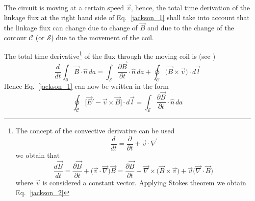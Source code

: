 \documentclass[11pt,a4paper]{scrartcl}
\numberwithin{equation}{section}
\theoremstyle{it}
\theoremstyle{definition}
\begin{document}
\begin{onehalfspace}
The circuit is moving at a certain speed $\vec{v}$, hence, the total time 
derivation of the linkage flux at the right hand side of Eq.~\ref{jackson_1} 
shall take into account that the linkage flux can change due to change of 
$\vec{B}$ and due to the change of the contour $\mathcal{C}$ (or $\mathcal{S}$) 
due to the movement of the coil. 


The total time derivative\footnote{
	The concept of the convective derivative can be used \begin{equation*}
		\frac{d}{dt} = \frac{\partial}{\partial t} + \vec{v}\cdot\vec{\nabla}
	\end{equation*}
	we obtain that
	\begin{equation*}
		\frac{d\vec{B}}{dt} = \frac{\partial\vec{B}}{\partial t} + 
		\Big(\vec{v}\cdot\vec{\nabla}\Big)\vec{B} = \frac{\partial 
			\vec{B}}{\partial 
			t}+\vec{\nabla}\times\Big(\vec{B}\times\vec{v}\Big)+\vec{v}\Big(\vec{\nabla}\cdot\vec{B}\Big)
	\end{equation*}
	where $\vec{v}$ is considered a constant vector. Applying Stokes theorem we 
	obtain Eq.~\ref{jackson_2}
} of the flux through the moving coil is (see \cite{p14})
\begin{equation}\label{jackson_2}
	\frac{d}{dt}\int_\mathcal{S}\vec{B}\cdot\hat{n}\,da = 
	\int_\mathcal{S}\frac{\partial\vec{B}}{\partial t}\cdot\hat{n}\,da + 
	\oint_\mathcal{C}\Big(\vec{B}\times\vec{v}\Big)\cdot d\vec{l}
\end{equation}
Hence Eq.~\ref{jackson_1} can now be written in the form
\begin{equation}\label{jackson_3}
	\oint_\mathcal{C}\Big[\vec{E}'-\vec{v}\times\vec{B}\Big]\cdot d\vec{l} = 
	\int_\mathcal{S}\frac{\partial\vec{B}}{\partial t}\cdot\hat{n}\,da
\end{equation}


\end{onehalfspace}
\end{document}
